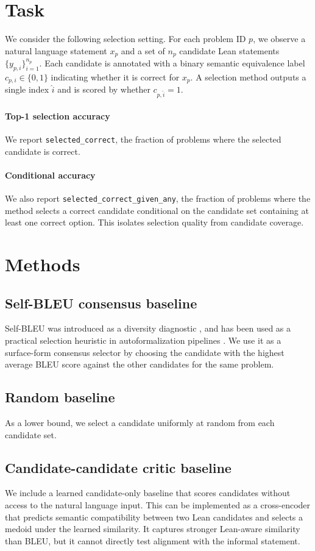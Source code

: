 \documentclass{article}
\begin{document}
\section{Task}
We consider the following selection setting.
For each problem ID $p$, we observe a natural language statement $x_p$ and a set of $n_p$ candidate Lean statements $\{y_{p,i}\}_{i=1}^{n_p}$.
Each candidate is annotated with a binary semantic equivalence label $c_{p,i} \in \{0,1\}$ indicating whether it is correct for $x_p$.
A selection method outputs a single index $\hat{i}$ and is scored by whether $c_{p,\hat{i}} = 1$.

\paragraph{Top-1 selection accuracy}
We report \texttt{selected\_correct}, the fraction of problems where the selected candidate is correct.

\paragraph{Conditional accuracy}
We also report \texttt{selected\_correct\_given\_any}, the fraction of problems where the method selects a correct candidate conditional on the candidate set containing at least one correct option.
This isolates selection quality from candidate coverage.

\section{Methods}

\subsection{Self-BLEU consensus baseline}
Self-BLEU was introduced as a diversity diagnostic \citep{zhu2018texygen}, and has been used as a practical selection heuristic in autoformalization pipelines \citep{poiroux2025reliable}.
We use it as a surface-form consensus selector by choosing the candidate with the highest average BLEU score against the other candidates for the same problem.

\subsection{Random baseline}
As a lower bound, we select a candidate uniformly at random from each candidate set.

\subsection{Candidate-candidate critic baseline}
We include a learned candidate-only baseline that scores candidates without access to the natural language input.
This can be implemented as a cross-encoder that predicts semantic compatibility between two Lean candidates and selects a medoid under the learned similarity.
It captures stronger Lean-aware similarity than BLEU, but it cannot directly test alignment with the informal statement.
\end{document}
